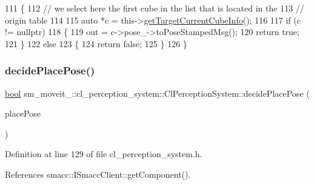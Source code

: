 \begin{DoxyCode}
111             \{
112                 \textcolor{comment}{// we select here the first cube in the list that is located in the}
113                 \textcolor{comment}{// origin table}
114 
115                 \textcolor{keyword}{auto} *c = this->\hyperlink{classsm__moveit__4_1_1cl__perception__system_1_1ClPerceptionSystem_ac4b944cebb2055a85a33129665df5dcf}{getTargetCurrentCubeInfo}();
116 
117                 \textcolor{keywordflow}{if} (c != \textcolor{keyword}{nullptr})
118                 \{
119                     out = c->pose\_->toPoseStampedMsg();
120                     \textcolor{keywordflow}{return} \textcolor{keyword}{true};
121                 \}
122                 \textcolor{keywordflow}{else}
123                 \{
124                     \textcolor{keywordflow}{return} \textcolor{keyword}{false};
125                 \}
126             \}
\end{DoxyCode}
\mbox{\label{classsm__moveit__4_1_1cl__perception__system_1_1ClPerceptionSystem_af6ff9a225d451bdee312573296ed02a8}} 
\subsubsection{\texorpdfstring{decide\+Place\+Pose()}{decidePlacePose()}}
{\footnotesize\ttfamily \hyperlink{classbool}{bool} sm\+\_\+moveit\+\_\+::cl\+\_\+perception\+\_\+system\+::\+Cl\+Perception\+System\+::decide\+Place\+Pose (\begin{DoxyParamCaption}\item[{geometry\+\_\+msgs\+::\+Pose\+Stamped \&}]{place\+Pose }\end{DoxyParamCaption})\hspace{0.3cm}{\ttfamily [inline]}}



Definition at line 129 of file cl\+\_\+perception\+\_\+system.\+h.



References smacc\+::\+I\+Smacc\+Client\+::get\+Component().


